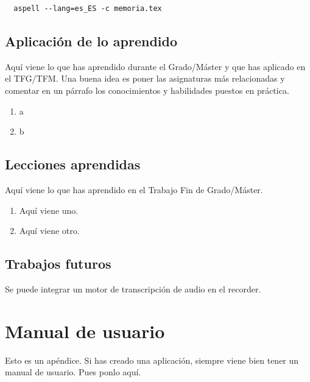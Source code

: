 \documentclass[a4paper, 12pt]{book}
\begin{document}
\begin{verbatim}
  aspell --lang=es_ES -c memoria.tex
\end{verbatim}

\section{Aplicación de lo aprendido}
\label{sec:aplicacion}

Aquí viene lo que has aprendido durante el Grado/Máster y que has aplicado en el TFG/TFM. Una buena idea es poner las asignaturas más relacionadas y comentar en un párrafo los conocimientos y habilidades puestos en práctica.

\begin{enumerate}
  \item a
  \item b
\end{enumerate}


\section{Lecciones aprendidas}
\label{sec:lecciones_aprendidas}

Aquí viene lo que has aprendido en el Trabajo Fin de Grado/Máster.

\begin{enumerate}
  \item Aquí viene uno.
  \item Aquí viene otro.
\end{enumerate}


\section{Trabajos futuros}
\label{sec:trabajos_futuros}

Se puede integrar un motor de transcripción de audio en el recorder.



\cleardoublepage
\appendix
\chapter{Manual de usuario}
\label{app:manual}

Esto es un apéndice.
Si has creado una aplicación, siempre viene bien tener un manual de usuario.
Pues ponlo aquí.
\end{document}
